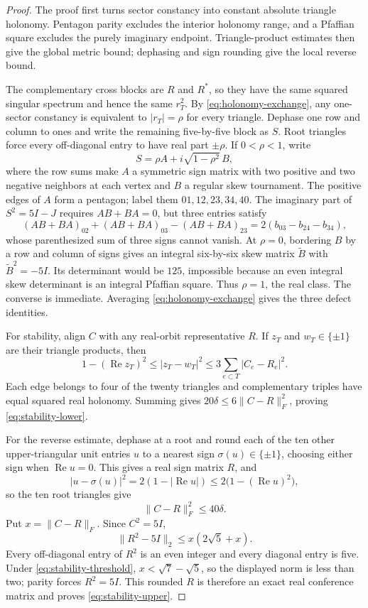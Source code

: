 \documentclass[11pt]{article}
\theoremstyle{remark}
\begin{document}
\begin{proof}
The proof first turns sector constancy into constant absolute triangle
holonomy.  Pentagon parity excludes the interior holonomy range, and a
Pfaffian square excludes the purely imaginary endpoint.  Triangle-product
estimates then give the global metric bound; dephasing and sign rounding give
the local reverse bound.

The complementary cross blocks are \(R\) and \(R^*\), so they have the same
squared singular spectrum and hence the same \(r_T^2\).
By \eqref{eq:holonomy-exchange}, any one-sector constancy is equivalent to
\(|r_T|=\rho\) for every triangle.  Dephase one row and column to ones and
write the remaining five-by-five block as \(S\).  Root triangles force every
off-diagonal entry to have real part \(\pm\rho\).  If \(0<\rho<1\), write
\[
 S=\rho A+i\sqrt{1-\rho^2}\,B,
\]
where the row sums make \(A\) a symmetric sign matrix with two positive and
two negative neighbors at each vertex and \(B\) a regular skew tournament.
The positive edges of \(A\) form a pentagon; label them
\(01,12,23,34,40\).  The imaginary part of \(S^2=5I-J\) requires
\(AB+BA=0\), but three entries satisfy
\[
 (AB+BA)_{02}+(AB+BA)_{03}-(AB+BA)_{23}
 =2(b_{03}-b_{24}-b_{34}),
\]
whose parenthesized sum of three signs cannot vanish.  At \(\rho=0\),
bordering \(B\) by a row and column of signs gives an integral
six-by-six skew matrix \(\widetilde B\) with
\(\widetilde B^2=-5I\).  Its determinant would be \(125\), impossible
because an even integral skew determinant is an integral Pfaffian square.
Thus \(\rho=1\), the real class.  The converse is immediate.  Averaging
\eqref{eq:holonomy-exchange} gives the three defect identities.

For stability, align \(C\) with any real-orbit representative \(R\).  If
\(z_T\) and \(w_T\in\{\pm1\}\) are their triangle products, then
\[
 1-(\operatorname{Re}z_T)^2\le |z_T-w_T|^2
 \le3\sum_{e\subset T}|C_e-R_e|^2.
\]
Each edge belongs to four of the twenty triangles and complementary triples
have equal squared real holonomy.  Summing gives
\(20\delta\le6\lVert C-R\rVert_F^2\), proving
\eqref{eq:stability-lower}.

For the reverse estimate, dephase at a root and round each of the ten other
upper-triangular unit entries \(u\) to a nearest sign
\(\sigma(u)\in\{\pm1\}\), choosing either sign when
\(\operatorname{Re}u=0\).  This gives a real sign matrix \(R\), and
\[
 |u-\sigma(u)|^2
 =2(1-|\operatorname{Re}u|)
 \le2\bigl(1-(\operatorname{Re}u)^2\bigr),
\]
so the ten root triangles give
\[
 \lVert C-R\rVert_F^2\le40\delta.
\]
Put \(x=\lVert C-R\rVert_F\).  Since \(C^2=5I\),
\[
 \lVert R^2-5I\rVert_2\le x(2\sqrt5+x).
\]
Every off-diagonal entry of \(R^2\) is an even integer and every diagonal
entry is five.  Under \eqref{eq:stability-threshold},
\(x<\sqrt7-\sqrt5\), so the displayed norm is less than two; parity forces
\(R^2=5I\).  This rounded \(R\) is therefore an exact real conference
matrix and proves \eqref{eq:stability-upper}.
\end{proof}
\end{document}
